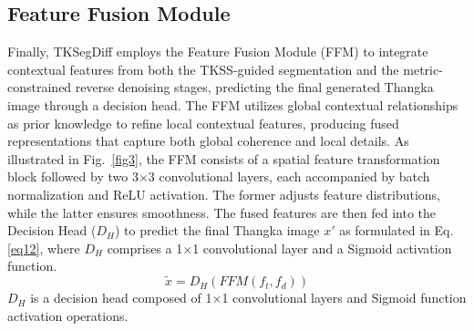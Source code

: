 \documentclass[sn-mathphys]{sn-jnl}%
\theoremstyle{thmstyleone}%
\theoremstyle{thmstyletwo}%
\theoremstyle{thmstylethree}%
\begin{document}
\subsection{Feature Fusion Module}
Finally, TKSegDiff employs the Feature Fusion Module (FFM) to integrate contextual features from both the TKSS-guided segmentation and the metric-constrained reverse denoising stages, predicting the final generated Thangka image through a decision head. The FFM utilizes global contextual relationships as prior knowledge to refine local contextual features, producing fused representations that capture both global coherence and local details. As illustrated in Fig.~\ref{fig3}, the FFM consists of a spatial feature transformation block followed by two 3×3 convolutional layers, each accompanied by batch normalization and ReLU activation. The former adjusts feature distributions, while the latter ensures smoothness. The fused features are then fed into the Decision Head ($ D_H $) to predict the final Thangka image $ x' $ as formulated in Eq.\eqref{eq12}, where $ D_H $ comprises a 1×1 convolutional layer and a Sigmoid activation function. 
\begin{equation}
	\tilde x = {D_H}(FFM({f_t},{f_d}))
	\label{eq12}
\end{equation}
$ D_H $ is a decision head composed of 1×1 convolutional layers and Sigmoid function activation operations.
\end{document}
